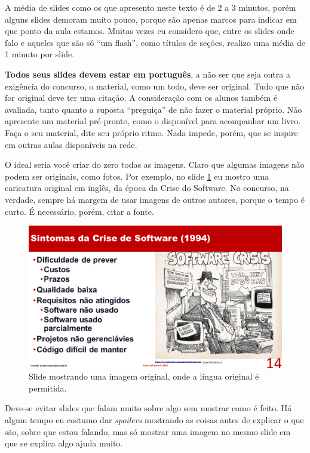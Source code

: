 \documentclass[12pt]{article}
\def\tam{0.5}
\begin{document}
A média de slides como os que apresento neste texto é de 2 a 3 minutos, porém alguns slides demoram muito pouco, porque são apenas marcos para indicar em que ponto da aula estamos. Muitas vezes eu considero que, entre os slides onde falo e aqueles que são só ``um flash'', como títulos de seções, realizo uma média de 1 minuto por slide.

\textbf{Todos seus slides devem estar em português}, a não ser que seja outra a exigência do concurso, o material, como um todo, deve ser original.
Tudo que não for original deve ter uma citação.
A consideração com os alunos também é avaliada, tanto quanto a suposta ``preguiça'' de não fazer o material próprio.
Não apresente um material pré-pronto, como o disponível para acompanhar um livro.
Faça o seu material, dite seu próprio ritmo.
Nada impede, porém, que se inspire em outras aulas disponíveis na rede.

O ideal seria você criar do zero todas as imagens.
Claro que algumas imagens não podem ser originais, como fotos.
Por exemplo, no slide \ref{fig:crisis} eu mostro uma caricatura original em inglês, da época da Crise do Software.
No concurso, na verdade, sempre há  margem de usar imagens de outros autores, porque o tempo é curto.
É necessário, porém, citar a fonte.

\begin{figure}[!htb]
    \centering
    \includegraphics[width=\tam\linewidth]{imagens/crisis.png}
    \caption{Slide mostrando uma imagem original, onde a língua original é permitida.}
    \label{fig:crisis}
\end{figure}

Deve-se evitar slides que falam muito sobre algo sem mostrar como é feito.
Há algum tempo eu costumo dar \textit{spoilers} mostrando as coisas antes de explicar o que são, sobre que estou falando, mas só mostrar uma imagem no mesmo slide em que se explica algo ajuda muito.
\end{document}
